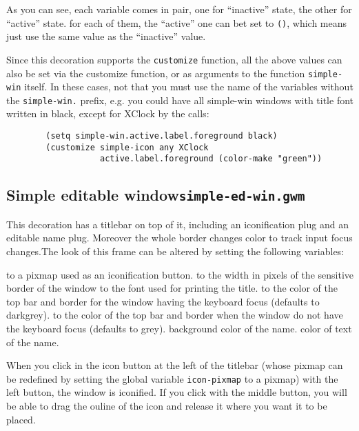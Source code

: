 As you can see, each variable comes in pair, one for ``inactive'' state, the
other for ``active'' state. for each of them, the ``active'' one can bet set
to \verb|()|, which means just use the same value as the ``inactive'' value.

Since this decoration supports the \verb|customize| function, all the above
values can also be set via the customize function, or as arguments to the
function \verb|simple-win| itself. In these cases, not that you must use the
name of the variables without the \verb|simple-win.| prefix, e.g. you could
have all simple-win windows with title font written in black, except for
XClock by the calls:

{\exemplefont\begin{verbatim}
        (setq simple-win.active.label.foreground black)
        (customize simple-icon any XClock
                   active.label.foreground (color-make "green"))
\end{verbatim}}


\subsection{Simple editable window\hfill{\tt simple-ed-win.gwm}}
\label{simple-ed-win}

\centerline{}

This decoration has a titlebar on top of it, including an iconification
plug and an editable name plug. Moreover the whole border changes color to
track input focus changes.The look of this
frame can be altered by setting the following variables:

\begin{description}
 to a pixmap used as an iconification button.
 to the width in pixels of the 
sensitive border of the window
 to the font used for printing the title.
 to the color of the top bar and border
 for the window having the keyboard focus (defaults to darkgrey).
 to the color of the top bar and border
when the window do not have the keyboard focus (defaults to grey).
 background color of the name.
 color of text of the name.
\end{description}

When you click in the icon button at the left of the titlebar (whose pixmap
can be redefined by setting the global variable \verb"icon-pixmap" to a
pixmap) with the left button, the window is iconified. If you click with the
middle button, you will be able to drag the ouline of the icon and release
it where you want it to be placed.

